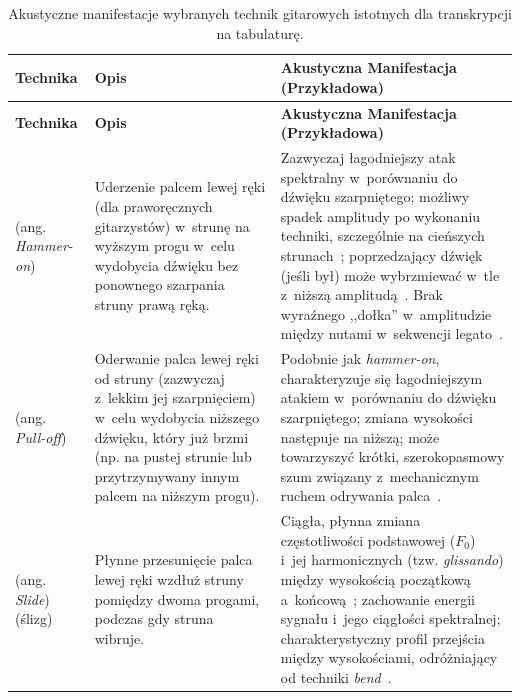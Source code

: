 \begin{longtable}{|p{}|p{}|p{}|}
    \caption[Wybrane techniki gitarowe i ich manifestacje akustyczne]{Akustyczne manifestacje wybranych technik gitarowych istotnych dla transkrypcji na tabulaturę.}
    \label{tab:techniki_gitarowe_latex_poprawiona} \\
    \hline
    \textbf{Technika} & \textbf{Opis} & \textbf{Akustyczna Manifestacja (Przykładowa)} \\
    \hline
    \endfirsthead
    \hline
    \textbf{Technika} & \textbf{Opis} & \textbf{Akustyczna Manifestacja (Przykładowa)} \\
    \hline
    \endhead
    \hline
    \endfoot
    \hline
    \endlastfoot
    (ang. \textit{Hammer-on}) & Uderzenie palcem lewej ręki (dla praworęcznych gitarzystów) w~strunę na wyższym progu w~celu wydobycia dźwięku bez ponownego szarpania struny prawą ręką.
    & Zazwyczaj łagodniejszy atak spektralny w~porównaniu do dźwięku szarpniętego; możliwy spadek amplitudy po wykonaniu techniki, szczególnie na cieńszych strunach~\autocite{Nasution2023HammerOn};
    poprzedzający dźwięk (jeśli był) może wybrzmiewać w~tle z~niższą amplitudą~\autocite{Nasution2023HammerOn,Su2014SparseCepstral}.
    Brak wyraźnego ,,dołka'' w~amplitudzie między nutami w~sekwencji legato~\autocite{Reboursiere2011GuitarController}.
    \\
    \hline
    (ang. \textit{Pull-off}) & Oderwanie palca lewej ręki od struny (zazwyczaj z~lekkim jej szarpnięciem) w~celu wydobycia niższego dźwięku, który już brzmi (np. na pustej strunie lub przytrzymywany innym palcem na niższym progu).
    & Podobnie jak \textit{hammer-on}, charakteryzuje się łagodniejszym atakiem w~porównaniu do dźwięku szarpniętego; zmiana wysokości następuje na niższą;
    może towarzyszyć krótki, szerokopasmowy szum związany z~mechanicznym ruchem odrywania palca~\autocite{Su2014SparseCepstral}.
    \\
    \hline
    (ang. \textit{Slide}) (ślizg) & Płynne przesunięcie palca lewej ręki wzdłuż struny pomiędzy dwoma progami, podczas gdy struna wibruje.
    & Ciągła, płynna zmiana częstotliwości podstawowej ($F_0$) i~jej harmonicznych (tzw. \textit{glissando}) między wysokością początkową a~końcową~\autocite{Su2014SparseCepstral,Reboursiere2011GuitarController};
    zachowanie energii sygnału i~jego ciągłości spektralnej; charakterystyczny profil przejścia między wysokościami, odróżniający od techniki \textit{bend}~\autocite{Su2014SparseCepstral}.
    \\

\end{longtable}
